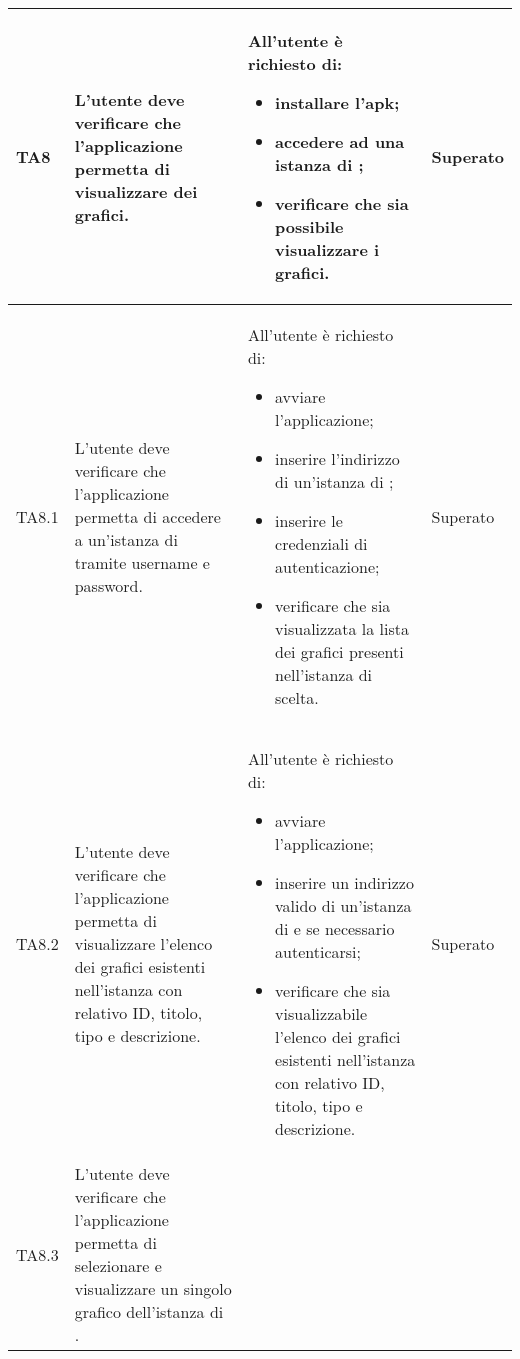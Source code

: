 \begin{longtabu}{| X[0.5] | X | X | X[0.5] |}
	TA8 & L'utente deve verificare che l'applicazione  permetta di visualizzare dei grafici.

		& All'utente è richiesto di:
		\begin{itemize}
			\item installare l'apk;
			\item accedere ad una istanza di \projectname{};
			\item verificare che sia possibile visualizzare i grafici.
		\end{itemize}
& Superato \\ \hline

	TA8.1 & L'utente deve verificare che l'applicazione  permetta di accedere a un'istanza di \projectname{} tramite username e password.

		& All'utente è richiesto di:
		\begin{itemize}
			\item avviare l'applicazione;
			\item inserire l'indirizzo di un'istanza di \projectname{};
			\item inserire le credenziali di autenticazione;
			\item verificare che sia visualizzata la lista dei grafici presenti nell'istanza di \projectname{} scelta.
		\end{itemize}
& Superato \\ \hline

	TA8.2 & L'utente deve verificare che l'applicazione  permetta di visualizzare l'elenco dei grafici esistenti nell'istanza \projectname{} con relativo ID, titolo, tipo e descrizione.

		& All'utente è richiesto di:
		\begin{itemize}
			\item avviare l'applicazione;
			\item inserire un indirizzo valido di un'istanza di \projectname{} e se necessario autenticarsi;
			\item verificare che sia visualizzabile l'elenco dei grafici esistenti nell'istanza \projectname{} con relativo ID, titolo, tipo e descrizione.
		\end{itemize}
& Superato \\ \hline

	TA8.3 & L'utente deve verificare che l'applicazione  permetta di selezionare e visualizzare un singolo grafico dell'istanza di \projectname{}.


\end{longtabu}
